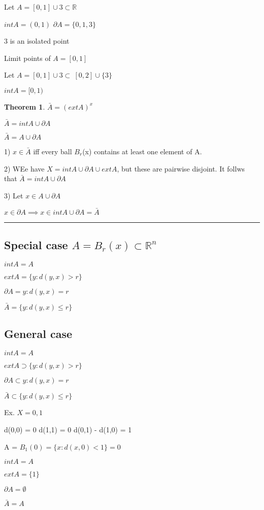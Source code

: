 \documentclass[twoside]{article}
\newcounter{lecnum}
\newtheorem{theorem}{Theorem}[lecnum]
\newenvironment{proof}{{\bf Proof:}}{\hfill\rule{2mm}{2mm}}
\newcommand\R{\mathbb{R}}
\begin{document}
Let $A = [0,1] \cup {3} \subset \R$

$int A = (0,1)$
$\partial A = \{ 0, 1, 3\}$

3 is an isolated point 

Limit points of $A = [0,1]$

Let $A = [0,1] \cup {3} \subset \ [0,2] \cup \{3\}$

$int A = [0,1)$

\begin{theorem}
    $\bar A = (ext A)^x$

    $\bar A = int A \cup \partial A$


    $\bar A = A \cup \partial A$
\end{theorem}

\begin{proof}
    1) $x \in \bar A$ iff every ball $B_r$(x) contains at least one element of A. 

    2) WEe have $X = int A \cup \partial A \cup ext A$, but these are pairwise disjoint. It follws that $\bar A = int A \cup \partial A$
    
    3) Let $x \in A \cup \partial A$

    $x \in \partial A \implies x \in int A \cup \partial A = \bar A$

\end{proof}

\subsection{Special case $A = B_r(x) \subset \R^n$} 

$int A = A$

$ext A = \{y : d(y,x) > r\}$

$\partial A = {y : d(y,x) = r}$

$\bar A = \{y : d(y,x) \leq  r\}$ 

\subsection{General case }

$int A = A$

$ext A \supset \{y : d(y,x) > r\}$

$\partial A \subset {y : d(y,x) = r}$

$\bar A \subset \{y : d(y,x) \leq  r\}$ 

Ex. $X = {0,1}$


    d(0,0) = 0
    d(1,1) = 0
    d(0,1) - d(1,0) = 1

A = $B_1(0) = \{x : d(x,0) < 1\} = {0}$

$int A = A $

$ext A = \{1\}$

$\partial A = \emptyset$

$\bar A = A$
\end{document}
